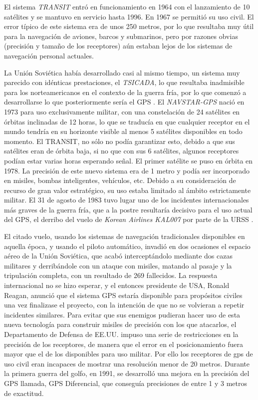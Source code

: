 El sistema \textit{TRANSIT} entró en funcionamiento en 1964 con el lanzamiento de 10 satélites y se mantuvo en servicio
hasta 1996. En 1967 se permitió su uso civil. El error típico de este sistema era de unos 250
metros, por lo que resultaba muy útil para la navegación de aviones, barcos y submarinos, pero
por razones obvias (precisión y tamaño de los receptores) aún estaban lejos de los sistemas de
navegación personal actuales.

La Unión Soviética había desarrollado casi al mismo tiempo, un sistema muy parecido con
idénticas prestaciones, el \textit{TSICADA}, lo que resultaba inadmisible para los norteamericanos en el
contexto de la guerra fría, por lo que comenzó a desarrollarse lo que posteriormente sería el
\ac{GPS} \cite{Pala10}.
El \textit{NAVSTAR-GPS} nació en 1973 para uso exclusivamente militar, con una constelación de 24
satélites en órbitas inclinadas de 12 horas, lo que se traducía en que cualquier receptor en el
mundo tendría en su horizonte visible al menos 5 satélites disponibles en todo momento. El
TRANSIT, no sólo no podía garantizar esto, debido a que sus satélites eran de órbita baja, si no
que con sus 6 satélites, algunos receptores podían estar varias horas esperando señal. El primer
satélite se puso en órbita en 1978. La precisión de este nuevo sistema era de 1 metro y podía
ser incorporado en misiles, bombas inteligentes, vehículos, etc. Debido a su consideración de
recurso de gran valor estratégico, su uso estaba limitado al ámbito estrictamente militar.
El 31 de agosto de 1983 tuvo lugar uno de los incidentes internacionales más graves de la
guerra fría, que a la postre resultaría decisivo para el uso actual del \ac{GPS}, el derribo del vuelo de
\textit{Korean Airlines KAL007} por parte de la \ac{URSS} \cite{Kore15}.

El citado vuelo, usando los sistemas de navegación tradicionales disponibles en aquella época, y
usando el piloto automático, invadió en dos ocasiones el espacio aéreo de la Unión Soviética,
que acabó interceptándolo mediante dos cazas militares y derribándole con un ataque con
misiles, matando al pasaje y la tripulación completa, con un resultado de 269 fallecidos.
La respuesta internacional no se hizo esperar, y el entonces presidente de \ac{USA}, Ronald Reagan,
anunció que el sistema \ac{GPS} estaría disponible para propósitos civiles una vez finalizase el
proyecto, con la intención de que no se volvieran a repetir incidentes similares.
Para evitar que sus enemigos pudieran hacer uso de esta nueva tecnología para construir
misiles de precisión con los que atacarlos, el Departamento de Defensa de \ac{EE.UU.} impuso una
serie de restricciones en la precisión de los receptores, de manera que el error en el
posicionamiento fuera mayor que el de los disponibles para uso militar. Por ello los receptores de gps de uso
civil eran incapaces de mostrar una resolución menor de 20 metros.
Durante la primera guerra del golfo, en 1991, se desarrolló una mejora en la precisión del \ac{GPS}
llamada, \ac{GPS} Diferencial, que conseguía precisiones de entre 1 y 3 metros de exactitud.

